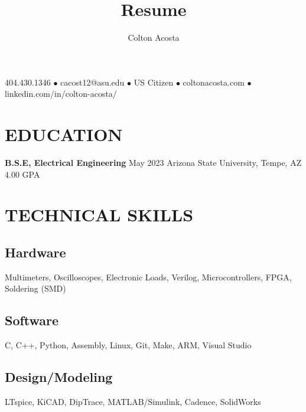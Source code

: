 \documentclass{article}
\makeatletter
\renewcommand{\maketitle}{
	\begin{center}
		{\huge\bfseries
			\theauthor}
			
		404.430.1346 $\bullet$ cacost12@asu.edu $\bullet$ US Citizen $\bullet$ coltonacosta.com $\bullet$ linkedin.com/in/colton-acosta/
	\end{center}
}
\makeatother
\begin{document}
\title{Resume}
\author{Colton Acosta}
\maketitle
\section{EDUCATION}
\textbf{B.S.E, Electrical Engineering}
\hfill 
May 2023
\linebreak
Arizona State University, Tempe, AZ 
\hfill
4.00 GPA

\section{TECHNICAL SKILLS}
\subsection{Hardware}
Multimeters, Oscilloscopes, Electronic Loads, Verilog, Microcontrollers, FPGA, Soldering (SMD) 
\subsection{Software} 
C, C++, Python, Assembly, Linux, Git, Make, ARM, Visual Studio 
\subsection{Design/Modeling}
LTspice, KiCAD, DipTrace, MATLAB/Simulink, Cadence, SolidWorks
\end{document}

